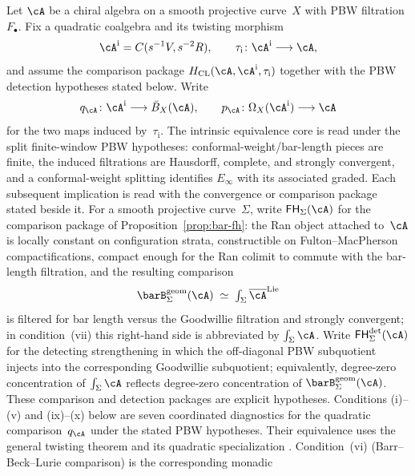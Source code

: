 \begin{theorem}
\label{thm:koszul-equivalences-meta}

Let $\cA$ be a chiral algebra on a smooth projective curve~$X$
with PBW filtration $F_\bullet$.  Fix a quadratic coalgebra and its
twisting morphism
\[
 \cA^{\mathrm i}=C(s^{-1}V,s^{-2}R),\qquad
 \tau_{\mathrm i}\colon\cA^{\mathrm i}\longrightarrow\cA,
\]
and assume the comparison package
$H_{\mathrm{CL}}(\cA,\cA^{\mathrm i},\tau_{\mathrm i})$ together with the
PBW detection hypotheses stated below.  Write
\[
 q_\cA\colon\cA^{\mathrm i}\longrightarrow\bar B_X(\cA),
 \qquad
 p_\cA\colon\Omega_X(\cA^{\mathrm i})\longrightarrow\cA
\]
for the two maps induced by~$\tau_{\mathrm i}$.  The intrinsic equivalence
core is read under the split finite-window PBW hypotheses: conformal-weight/bar-length
pieces are finite, the induced filtrations are Hausdorff, complete, and
strongly convergent, and a conformal-weight splitting identifies
$E_\infty$ with its associated graded.  Each subsequent implication
is read with the convergence or comparison package stated beside it.
For a smooth projective curve~$\Sigma$, write
$\mathsf{FH}_\Sigma(\cA)$ for the comparison package of
Proposition~\ref{prop:bar-fh}: the Ran object attached to~$\cA$ is
locally constant on configuration strata, constructible on
Fulton--MacPherson compactifications, compact enough for the Ran
colimit to commute with the bar-length filtration, and the resulting
comparison
\[
\barB^{\mathrm{geom}}_\Sigma(\cA)
\;\simeq\;
\textstyle\int_\Sigma \overline{\cA}^{\mathrm{Lie}}
\]
is filtered for bar length versus the Goodwillie filtration and
strongly convergent; in condition~\textup{(vii)} this right-hand
side is abbreviated by $\int_\Sigma\cA$. Write
$\mathsf{FH}^{\mathrm{det}}_\Sigma(\cA)$ for the detecting
strengthening in which the off-diagonal PBW subquotient injects into
the corresponding Goodwillie subquotient; equivalently, degree-zero concentration of
$\int_\Sigma\cA$ reflects degree-zero concentration of
$\barB^{\mathrm{geom}}_\Sigma(\cA)$.
These comparison and detection packages are explicit hypotheses.
Conditions \textup{(i)--(v)} and \textup{(ix)--(x)} below are seven
coordinated diagnostics for the quadratic comparison~$q_\cA$ under the
stated PBW hypotheses.  Their equivalence uses the general twisting theorem
\cite[Theorem~2.3.2]{LV12} and its quadratic specialization
\cite[Theorem~3.4.6]{LV12}.  Condition~\textup{(vi)}
(Barr--Beck--Lurie comparison) is the corresponding monadic

\end{theorem}
